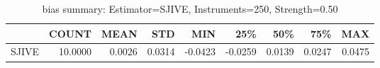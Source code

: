 \begin{table}[ht]
\centering
\caption{bias summary: Estimator=SJIVE, Instruments=250, Strength=0.50}
\begin{tabular}{lrrrrrrrr}
\toprule
 & COUNT & MEAN & STD & MIN & 25\% & 50\% & 75\% & MAX \\
\midrule
SJIVE & 10.0000 & 0.0026 & 0.0314 & -0.0423 & -0.0259 & 0.0139 & 0.0247 & 0.0475 \\
\bottomrule
\end{tabular}
\end{table}
